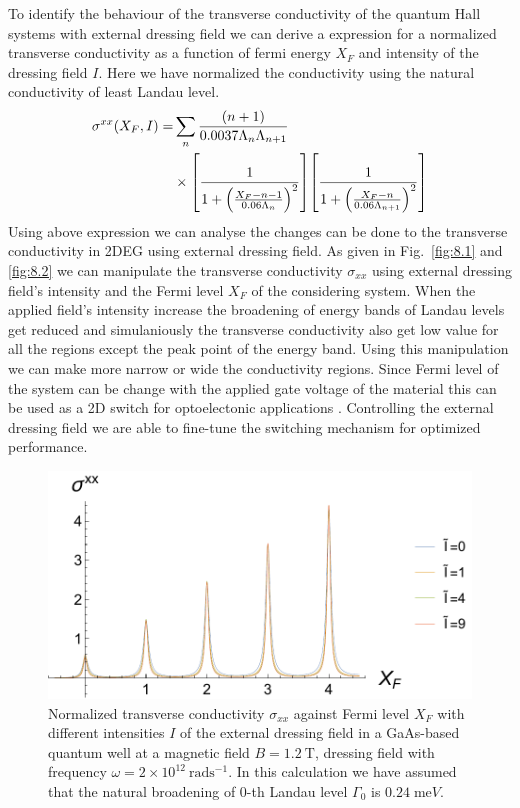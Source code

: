 To identify the behaviour of the transverse conductivity of the quantum Hall systems with external dressing field we can derive a expression for a normalized
transverse conductivity as a function of fermi energy $X_F$ and intensity of the dressing field $I$. Here we have normalized the conductivity using the natural conductivity of least Landau level.
\begin{equation} \label{eq_36}
  \begin{aligned}
    \sigma^{xx}(X_F,I) = &
    \sum_{n}
    \frac{\qty(n+1)}{0.0037\Lambda_n \Lambda_{n+1}} \\
    & \times
    \qty[
      \frac{1}
      {
        1 + \qty(\frac{X_F - n -1}{0.06\Lambda_n})^2
      }
    ]
    \qty[
      \frac{1}
      {
        1 + \qty(\frac{X_F - n}{0.06\Lambda_{n+1}})^2
      }
    ]
  \end{aligned}
\end{equation}
Using above expression we can analyse the changes can be done to the transverse conductivity in 2DEG using external dressing field. As given in Fig.~\ref{fig:8.1} and \ref{fig:8.2} we can manipulate the transverse conductivity $\sigma_{xx}$ using external dressing field's intensity and the Fermi level $X_F$ of the considering system. When the applied field's intensity increase the broadening of energy bands of Landau levels get reduced and simulaniously the transverse conductivity also get low value for all the regions except the peak point of the energy band. Using this manipulation we can make more narrow or wide the conductivity regions. Since Fermi level of the system can be change with the applied gate voltage of the material this can be used as a 2D switch for optoelectonic applications \cite{dini16}. Controlling  the external dressing field we are able to fine-tune the switching mechanism for optimized performance.
\begin{figure}[t]
\includegraphics[scale=0.55]{figures/fig_5}
\caption{\label{fig_1} Normalized transverse conductivity $\sigma_{xx}$ against Fermi level $X_F$ with different intensities $I$ of the external dressing field in a GaAs-based quantum well at a magnetic field $B = 1.2~\text{T}$, dressing field with frequency $\omega =2\times10^{12}~\text{rad}\text{s}^{-1}$. In this calculation we have assumed that the natural  broadening of $0$-th Landau level $\Gamma_0$ is $0.24\;\text{me}V$.}
\end{figure}
